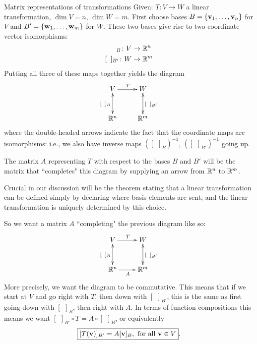 \begin{frame}{Matrix representations of transformations}
Given: $T\colon V\rightarrow W$ a linear transformation, $\dim V=n$, $\dim W=m$. 
\bspace
First \alert{choose} bases $B=\{{\mathbf v}_1,\dots,{\mathbf v}_n\}$ for $V$ and $B'=\{{\mathbf w}_1,\dots,{\mathbf w}_m\}$ for $W$.  These two bases give rise to two coordinate vector isomorphisms: 
\begin{align*}
[\hspace{5pt}]_B\colon V&\rightarrow \R^n\\
[\hspace{5pt}]_{B'}\colon W&\rightarrow \R^m
\end{align*}
\pause Putting all three of these maps together yields the diagram 
\[
\xymatrix@C=2pc @R=2.5pc{
V\ar[r]^{T} \ar@{<->}[d]_{[\hspace{5pt}]_B}& W \ar@{<->}[d]^{[\hspace{5pt}]_{B'}}\\
\R^n & \R^m
}
\]
where the double-headed arrows indicate the fact that the coordinate maps are isomorphisms: i.e., we also have inverse maps $([\hspace{5pt}]_B)^{-1}$, $([\hspace{5pt}]_{B'})^{-1}$ going up.

The \alert{matrix $A$ representing $T$ with respect to the bases $B$ and $B'$} will be the matrix that ``completes" this diagram by supplying an arrow from ${\mathbb R}^n$ to ${\mathbb R}^m$. 

\bpause 
Crucial in our discussion will be the theorem stating that
\bb[(i)]
\ii a linear transformation can be defined simply by declaring where basis elements are sent, and 
\ii the linear transformation is uniquely determined by this choice.
\ee
\end{frame}
\begin{frame}
\footnotesize
So we want a matrix $A$ ``completing" the previous diagram like so:
\[
\xymatrix@C=2pc @R=2.5pc{
V\ar[r]^{T} \ar@{<->}[d]_{[\hspace{5pt}]_B}& W \ar@{<->}[d]^{[\hspace{5pt}]_{B'}}\\
\R^n\ar[r]_{A}& \R^m
}
\] 
\pause
More precisely, we want the diagram to be \alert{commutative}. 
\bspace This means that if we start at $V$ and go right with $T$, then down with $[\hspace{5pt}]_{B'}$, this is the same as first going down with $[\hspace{5pt}]_{B}$, then right with $A$. 
\bpause
In terms of function compositions this means we want $[\hspace{5pt}]_{B'}\circ T=A\circ[\hspace{5pt}]_{B}$, or equivalently 
\[
\boxed{[T({\mathbf v})]_{B'}=A[{\mathbf v}]_B, \text{ for all ${\mathbf v}\in V$}}.
\]
\end{frame}
